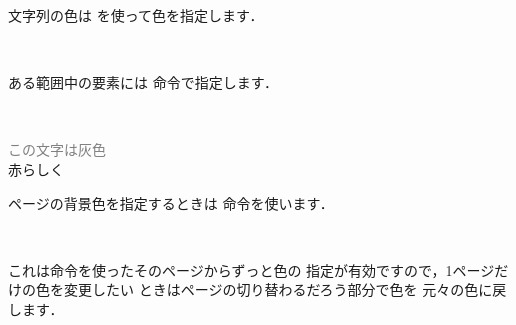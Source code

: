 \begin{InTeX}
\definecolor{MyYellow}{cmyk}{}
\end{InTeX}

文字列の色は を使って色を指定します．
\begin{Syntax}
 \\
\end{Syntax}
ある範囲中の要素には 命令で指定します．
\begin{Syntax}
  \\
\end{Syntax}
\begin{InOut}
\textcolor{Gray}{この文字は灰色}\\
\textcolor[rgb]{1,0,0}{赤らしく}\\
{}
\end{InOut}


ページの背景色を指定するときは 命令を使います．
%
\begin{Syntax}
\\
\end{Syntax}
これは命令を使ったそのページからずっと色の
指定が有効ですので，1ページだけの色を変更したい
ときはページの切り替わるだろう部分で色を
元々の色に戻します．


